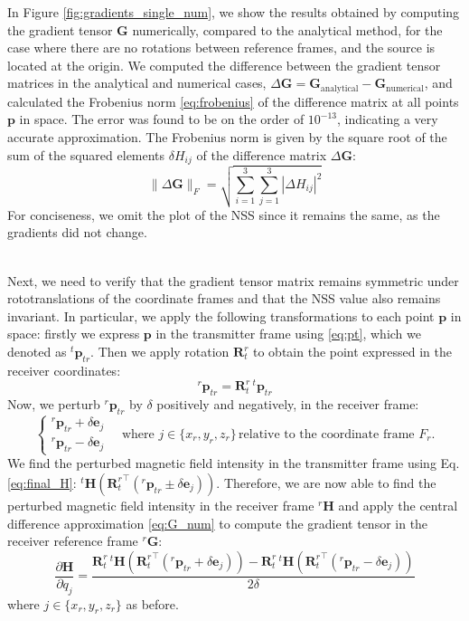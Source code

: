 In Figure \ref{fig:gradients_single_num}, we show the results obtained by computing the 
gradient tensor \( \mathbf{G} \) numerically, compared to the analytical method, 
for the case where there are no rotations between reference frames, and the source is located 
at the origin. We computed the difference between the gradient tensor matrices 
in the analytical and numerical cases, \( \Delta \mathbf{G} = \mathbf{G}_{\text{analytical}} - \mathbf{G}_{\text{numerical}} \), 
and calculated the Frobenius norm  \ref{eq:frobenius} of the difference matrix at all points \( \mathbf{p} \) in space.
The error was found to be on the order of \( 10^{-13} \), indicating a very accurate approximation.
The Frobenius norm is given by the square root of the sum of the squared elements \( \delta H_{ij} \) 
of the difference matrix \( \Delta \mathbf{G} \):
\begin{equation}
    \|\Delta \mathbf{G}\|_F = \sqrt{\sum_{i=1}^3 \sum_{j=1}^3 |\Delta H_{ij}|^2}
    \label{eq:frobenius}
\end{equation}
For conciseness, we omit the plot of the NSS since it remains the same, 
as the gradients did not change.
    
\noindent
\\
Next, we need to verify that the gradient tensor matrix remains symmetric under 
rototranslations of the coordinate frames and that the NSS value also remains invariant.
In particular, we apply the following transformations to each point $\mathbf{p}$ in space:
firstly we express $\mathbf{p}$ in the transmitter frame using \ref{eq:pt}, which we denoted as 
${}^t \mathbf{p}_{tr}$.
Then we apply rotation $\mathbf{R}^r_t$ to obtain the point expressed in the receiver coordinates:
\begin{equation}
   {}^r \mathbf{p}_{tr}  = \mathbf{R}^r_t \, {}^t \mathbf{p}_{tr}
   \label{eq:p__in_receiver}
\end{equation}
Now, we perturb ${}^r \mathbf{p}_{tr}$ by $\delta$ positively and negatively, in the receiver frame:
\[
\begin{cases}
    {}^r \mathbf{p}_{tr} + \delta \mathbf{e}_j \\
    {}^r \mathbf{p}_{tr} - \delta \mathbf{e}_j
\end{cases} 
\quad \text{where } j \in \{ x_r, y_r, z_r \} \, \text{relative to the coordinate frame } F_r.
\]
We find the perturbed magnetic field intensity in the transmitter frame using Eq. \ref{eq:final_H}:
${}^t \mathbf{H} ( {\mathbf{R}^r_t}^\top ({}^r \mathbf{p}_{tr} \pm \delta \mathbf{e}_j) )$.
Therefore, we are now able to find the perturbed magnetic field intensity in the receiver frame
${}^r \mathbf{H}$ and apply the central difference approximation 
\ref{eq:G_num} to compute the gradient tensor in the receiver reference frame 
${}^r \mathbf{G}$:
\begin{equation}
    \frac{\partial \mathbf{H}}{\partial q_j} = 
    \frac{
    \mathbf{R}^r_t \, {}^t \mathbf{H} ( {\mathbf{R}^r_t}^\top ({}^r \mathbf{p}_{tr} + \delta \mathbf{e}_j) )
    - \mathbf{R}^r_t \, {}^t \mathbf{H} ( {\mathbf{R}^r_t}^\top ({}^r \mathbf{p}_{tr} - \delta \mathbf{e}_j) )}
    {2 \delta}
\end{equation}
where $j \in \{ x_r, y_r, z_r \}$ as before.

